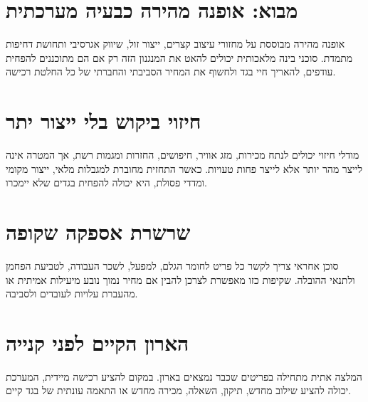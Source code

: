 \section{מבוא: אופנה מהירה כבעיה מערכתית}
אופנה מהירה מבוססת על מחזורי עיצוב קצרים, ייצור זול, שיווק אגרסיבי ותחושת דחיפות מתמדת. סוכני בינה מלאכותית יכולים להאט את המנגנון הזה רק אם הם מתוכננים להפחית עודפים, להאריך חיי בגד ולחשוף את המחיר הסביבתי והחברתי של כל החלטת רכישה.

\section{חיזוי ביקוש בלי ייצור יתר}
מודלי חיזוי יכולים לנתח מכירות, מזג אוויר, חיפושים, החזרות ומגמות רשת, אך המטרה אינה לייצר מהר יותר אלא לייצר פחות טעויות. כאשר התחזית מחוברת למגבלות מלאי, ייצור מקומי ומדדי פסולת, היא יכולה להפחית בגדים שלא יימכרו.

\section{שרשרת אספקה שקופה}
סוכן אחראי צריך לקשר כל פריט לחומר הגלם, למפעל, לשכר העבודה, לטביעת הפחמן ולתנאי ההובלה. שקיפות כזו מאפשרת לצרכן להבין אם מחיר נמוך נובע מיעילות אמיתית או מהעברת עלויות לעובדים ולסביבה.

\section{הארון הקיים לפני קנייה}
המלצה אתית מתחילה בפריטים שכבר נמצאים בארון. במקום להציע רכישה מיידית, המערכת יכולה להציע שילוב מחדש, תיקון, השאלה, מכירה מחדש או התאמה עונתית של בגד קיים.

